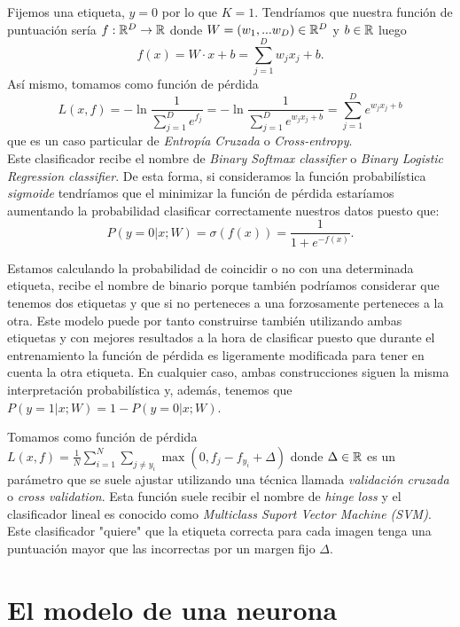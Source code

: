 \begin{ejemplo}\label{SoftMaxBinary}
Fijemos una etiqueta, $y=0$ por lo que $K=1$. Tendríamos que nuestra función de puntuación sería $f:\mathbb{R}^D \to \mathbb{R}$ donde $W=(w_1,...w_D)\in \mathbb{R}^D$ y $b\in \mathbb{R}$ luego $$f(x)=W\cdot x + b = \sum_{j=1}^D w_j x_j+b.$$ Así mismo, tomamos como función de pérdida $$L(x,f)=-\ln \frac{1}{\sum_{j=1}^D e^{f_j}}=-\ln \frac{1}{\sum_{j=1}^D e^{w_j x_j +b}}=\sum_{j=1}^D e^{w_j x_j +b}$$ que es un caso particular de \emph{Entropía Cruzada} o \emph{Cross-entropy}.\\

Este clasificador recibe el nombre de \emph{Binary Softmax classifier} o \emph{Binary Logistic Regression classifier}. De esta forma, si consideramos la función probabilística \emph{sigmoide} tendríamos que el minimizar la función de pérdida estaríamos aumentando la probabilidad clasificar correctamente nuestros datos puesto que: $$P(y=0 | x; W)=\sigma (f(x)) = \frac{1}{1+e^{-f(x)}}.$$

\begin{observacion}
Estamos calculando la probabilidad de coincidir o no con una determinada etiqueta, recibe el nombre de binario porque también podríamos considerar que tenemos dos etiquetas y que si no perteneces a una forzosamente perteneces a la otra. Este modelo puede por tanto construirse también utilizando ambas etiquetas y con mejores resultados a la hora de clasificar puesto que durante el entrenamiento la función de pérdida es ligeramente modificada para tener en cuenta la otra etiqueta. En cualquier caso, ambas construcciones siguen la misma interpretación probabilística y, además, tenemos que $P(y=1 | x; W)=1-P(y=0 | x; W)$.
\end{observacion}
\end{ejemplo}

\begin{ejemplo}\label{SVM}
Tomamos como función de pérdida $L(x,f)=\frac{1}{N} \sum_{i=1}^N \sum_{j \neq y_i} \max(0,f_j-f_y_i + \Delta)$ donde $\Delta \in \mathbb{R}$ es un parámetro que se suele ajustar utilizando una técnica llamada \emph{validación cruzada} o \emph{cross validation}. Esta función suele recibir el nombre de \emph{hinge loss} y el clasificador lineal es conocido como \emph{Multiclass Suport Vector Machine (SVM)}. Este clasificador "quiere" que la etiqueta correcta para cada imagen tenga una puntuación mayor que las incorrectas por un margen fijo $\Delta$.
\end{ejemplo}
\section{El modelo de una neurona}

